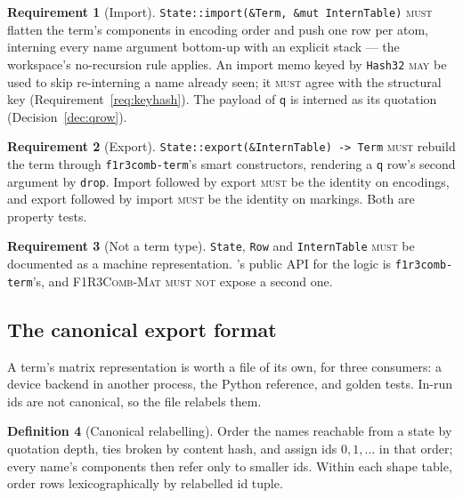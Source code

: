 \documentclass[11pt,a4paper]{article}
\newcommand{\code}[1]{\texttt{#1}}
\newcommand{\Mat}{\textsc{F1R3Comb-Mat}}
\newcommand{\MUST}{\textsc{must}}
\newcommand{\MUSTNOT}{\textsc{must not}}
\newcommand{\MAY}{\textsc{may}}
\newcommand{\qq}{\mathsf{q}}
\theoremstyle{definition}
\newtheorem{definition}{Definition}[section]
\newtheorem{requirement}[definition]{Requirement}
\theoremstyle{plain}
\begin{document}
\begin{requirement}[Import]\label{req:import}
\code{State::import(\&Term, \&mut InternTable)} \MUST{} flatten the term's
components in encoding order and push one row per atom, interning every name
argument bottom-up with an explicit stack --- the workspace's no-recursion
rule \cite[Req.~7.1]{combspec} applies. An import memo keyed by
\code{Hash32} \MAY{} be used to skip re-interning a name already seen; it
\MUST{} agree with the structural key (Requirement~\ref{req:keyhash}). The
payload of $\qq$ is interned as its quotation (Decision~\ref{dec:qrow}).
\end{requirement}

\begin{requirement}[Export]\label{req:export}
\code{State::export(\&InternTable) -> Term} \MUST{} rebuild the term through
\code{f1r3comb-term}'s smart constructors, rendering a $\qq$ row's second
argument by \code{drop}. Import followed by export \MUST{} be the identity on
encodings, and export followed by import \MUST{} be the identity on markings.
Both are property tests.
\end{requirement}

\begin{requirement}[Not a term type]\label{req:notaterm}
\code{State}, \code{Row} and \code{InternTable} \MUST{} be documented as a
machine representation. \cite[Req.~9.2]{combspec}'s public API for the logic
is \code{f1r3comb-term}'s, and \Mat{} \MUSTNOT{} expose a second one.
\end{requirement}

\subsection{The canonical export format}\label{sec:cmat}

A term's matrix representation is worth a file of its own, for three
consumers: a device backend in another process, the Python reference, and
golden tests. In-run ids are not canonical, so the file relabels them.

\begin{definition}[Canonical relabelling]\label{def:relabel}
Order the names reachable from a state by quotation depth, ties broken by
content hash, and assign ids $0,1,\dots$ in that order; every name's
components then refer only to smaller ids. Within each shape table, order rows
lexicographically by relabelled id tuple.
\end{definition}
\end{document}
